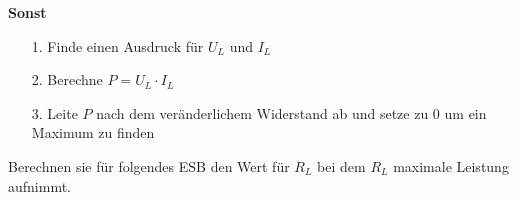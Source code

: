 \textbf{Sonst}

\begin{itemize}
	\item [1. ] Finde einen Ausdruck für $U_L$ und $I_L$
	\item [2. ] Berechne $P = U_L \cdot I_L$
	\item [3. ] Leite $P$ nach dem veränderlichem Widerstand ab und setze zu 0 um ein Maximum zu finden
\end{itemize}


\iend
\newpage
{}
\beginbsp
Berechnen sie für folgendes ESB den Wert für $R_L$ bei dem $R_L$ maximale Leistung aufnimmt.
\begin{center}
\end{center}
\iend


